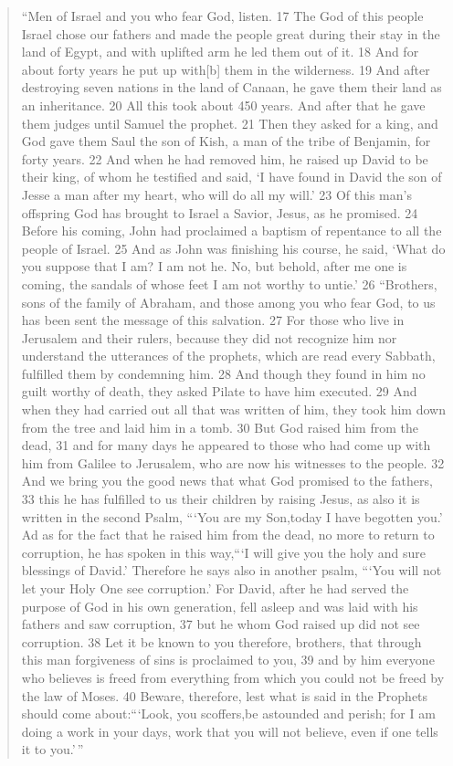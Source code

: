 \documentclass[
]{book}
\begin{document}
\begin{quote}
``Men of Israel and you who fear God, listen. 17 The God of this people Israel chose our fathers and made the people great during their stay in the land of Egypt, and with uplifted arm he led them out of it. 18 And for about forty years he put up with{[}b{]} them in the wilderness. 19 And after destroying seven nations in the land of Canaan, he gave them their land as an inheritance. 20 All this took about 450 years. And after that he gave them judges until Samuel the prophet. 21 Then they asked for a king, and God gave them Saul the son of Kish, a man of the tribe of Benjamin, for forty years. 22 And when he had removed him, he raised up David to be their king, of whom he testified and said, `I have found in David the son of Jesse a man after my heart, who will do all my will.' 23 Of this man's offspring God has brought to Israel a Savior, Jesus, as he promised. 24 Before his coming, John had proclaimed a baptism of repentance to all the people of Israel. 25 And as John was finishing his course, he said, `What do you suppose that I am? I am not he. No, but behold, after me one is coming, the sandals of whose feet I am not worthy to untie.'
26 ``Brothers, sons of the family of Abraham, and those among you who fear God, to us has been sent the message of this salvation. 27 For those who live in Jerusalem and their rulers, because they did not recognize him nor understand the utterances of the prophets, which are read every Sabbath, fulfilled them by condemning him. 28 And though they found in him no guilt worthy of death, they asked Pilate to have him executed. 29 And when they had carried out all that was written of him, they took him down from the tree and laid him in a tomb. 30 But God raised him from the dead, 31 and for many days he appeared to those who had come up with him from Galilee to Jerusalem, who are now his witnesses to the people. 32 And we bring you the good news that what God promised to the fathers, 33 this he has fulfilled to us their children by raising Jesus, as also it is written in the second Psalm,
```You are my Son,today I have begotten you.'
Ad as for the fact that he raised him from the dead, no more to return to corruption, he has spoken in this way,```I will give you the holy and sure blessings of David.'
Therefore he says also in another psalm, ```You will not let your Holy One see corruption.'
For David, after he had served the purpose of God in his own generation, fell asleep and was laid with his fathers and saw corruption, 37 but he whom God raised up did not see corruption. 38 Let it be known to you therefore, brothers, that through this man forgiveness of sins is proclaimed to you, 39 and by him everyone who believes is freed from everything from which you could not be freed by the law of Moses. 40 Beware, therefore, lest what is said in the Prophets should come about:```Look, you scoffers,be astounded and perish;
for I am doing a work in your days, work that you will not believe, even if one tells it to you.'\,''
\end{quote}
\end{document}
